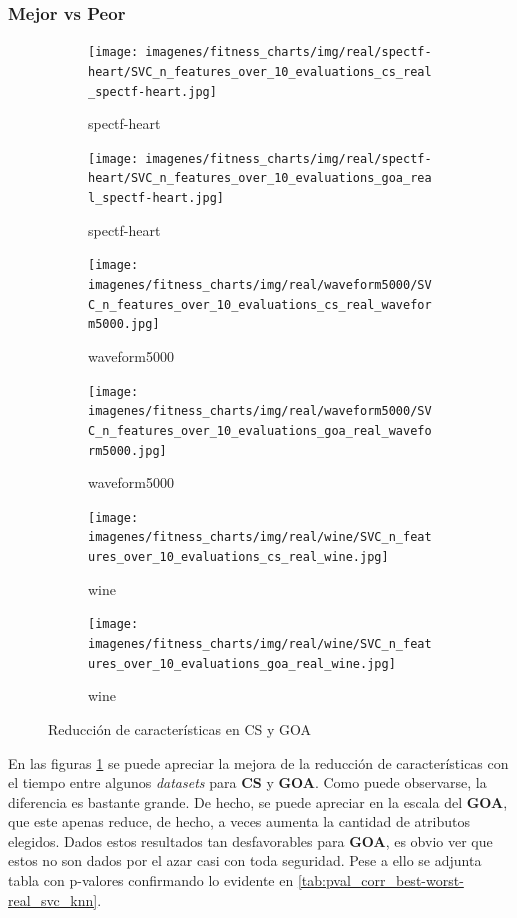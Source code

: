 \subsubsection{Mejor vs Peor}
\begin{figure}[htp]
    \centering
    \begin{subfigure}[htp]{0.45\textwidth}
        \texttt{[image: imagenes/fitness\_charts/img/real/spectf-heart/SVC\_n\_features\_over\_10\_evaluations\_cs\_real\_spectf-heart.jpg]}
        \caption{spectf-heart}
    \end{subfigure}
    \begin{subfigure}[htp]{0.45\textwidth}
        \texttt{[image: imagenes/fitness\_charts/img/real/spectf-heart/SVC\_n\_features\_over\_10\_evaluations\_goa\_real\_spectf-heart.jpg]}
        \caption{spectf-heart}
    \end{subfigure}

    \begin{subfigure}[htp]{0.45\textwidth}
        \texttt{[image: imagenes/fitness\_charts/img/real/waveform5000/SVC\_n\_features\_over\_10\_evaluations\_cs\_real\_waveform5000.jpg]}
        \caption{waveform5000}
    \end{subfigure}
    \begin{subfigure}[htp]{0.45\textwidth}
        \texttt{[image: imagenes/fitness\_charts/img/real/waveform5000/SVC\_n\_features\_over\_10\_evaluations\_goa\_real\_waveform5000.jpg]}
        \caption{waveform5000}
    \end{subfigure}

    \begin{subfigure}[htp]{0.45\textwidth}
        \texttt{[image: imagenes/fitness\_charts/img/real/wine/SVC\_n\_features\_over\_10\_evaluations\_cs\_real\_wine.jpg]}
        \caption{wine}
    \end{subfigure}
    \begin{subfigure}[htp]{0.45\textwidth}
        \texttt{[image: imagenes/fitness\_charts/img/real/wine/SVC\_n\_features\_over\_10\_evaluations\_goa\_real\_wine.jpg]}
        \caption{wine}
    \end{subfigure}
    \caption{Reducción de características en CS y GOA}
    \label{fig:svc_selected_rate_cs_goa_real}
\end{figure}

En las figuras \ref{fig:svc_selected_rate_cs_goa_real} se puede apreciar la mejora de la reducción de características con el tiempo entre algunos \textit{datasets} para \textbf{CS} y \textbf{GOA}. Como puede observarse, la diferencia es bastante grande. De hecho, se puede apreciar en la escala del \textbf{GOA}, que este apenas reduce, de hecho, a veces aumenta la cantidad de atributos elegidos. Dados estos resultados tan desfavorables para \textbf{GOA}, es obvio ver que estos no son dados por el azar casi con toda seguridad. Pese a ello se adjunta tabla con p-valores confirmando lo evidente en \ref{tab:pval_corr_best-worst-real_svc_knn}.

